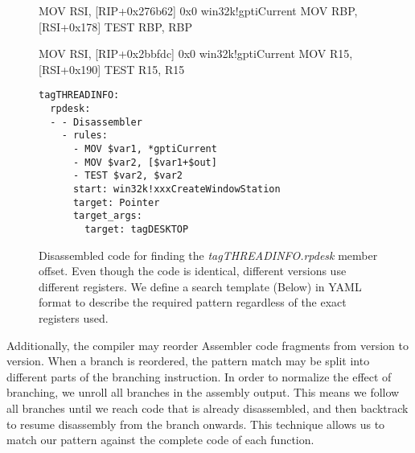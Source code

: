 \begin{figure}
\label{disassembly}
\begin{assembly}
 MOV RSI, [RIP+0x276b62]        0x0 win32k!gptiCurrent
 MOV RBP, [RSI+0x178]
 TEST RBP, RBP
\end{assembly}

\begin{assembly}
 MOV RSI, [RIP+0x2bbfdc]        0x0 win32k!gptiCurrent
 MOV R15, [RSI+0x190]
 TEST R15, R15
\end{assembly}

\begin{lstlisting}[basicstyle=\tiny\ttfamily, frame=single, linewidth=\columnwidth]
tagTHREADINFO:
  rpdesk:
  - - Disassembler
    - rules:
      - MOV $var1, *gptiCurrent
      - MOV $var2, [$var1+$out]
      - TEST $var2, $var2
      start: win32k!xxxCreateWindowStation
      target: Pointer
      target_args:
        target: tagDESKTOP

\end{lstlisting}
\caption{Disassembled code for finding the {\em tagTHREADINFO.rpdesk} member
  offset. Even though the code is identical, different versions use different
  registers. We define a search template (Below) in YAML format to describe the
  required pattern regardless of the exact registers used.  }
\end{figure}

Additionally, the compiler may reorder Assembler code fragments from version to
version. When a branch is reordered, the pattern match may be split into
different parts of the branching instruction. In order to normalize the effect
of branching, we unroll all branches in the assembly output. This means we
follow all branches until we reach code that is already disassembled, and then
backtrack to resume disassembly from the branch onwards. This technique allows
us to match our pattern against the complete code of each function.

